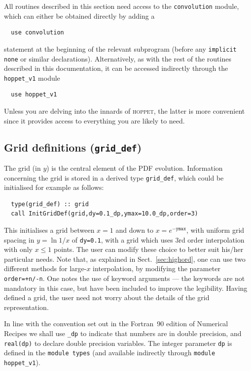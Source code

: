 \documentclass[12pt]{article}
\newcommand{\hoppet}{\textsc{hoppet}\xspace}
\newcommand{\ttt}[1]{\texttt{#1}}
\begin{document}
All routines described in this section need access to the
\texttt{convolution} module, which can either be obtained directly by
adding a 
\begin{lstlisting}
  use convolution
\end{lstlisting}
statement at the beginning of the relevant subprogram (before
any \ttt{implicit none} or similar declarations). Alternatively, as
with the rest of the routines described in this documentation, it can
be accessed indirectly through the \ttt{hoppet\_v1} module
\begin{lstlisting}
  use hoppet_v1
\end{lstlisting}
Unless you are delving into the innards of  \hoppet, the latter is
more convenient since it provides access to everything you are likely
to need.

\subsection{Grid definitions (\texttt{grid\_def})}
\label{sec:grid}

The grid (in $y$) is the central element of the PDF evolution.
Information concerning the grid is stored in a derived type
\texttt{grid\_def}, which could be initialised 
for example as follows:
\begin{lstlisting}
  type(grid_def) :: grid
  call InitGridDef(grid,dy=0.1_dp,ymax=10.0_dp,order=3)
\end{lstlisting}
This initialises a grid between $x=1$ and down to $x =
e^{-\texttt{ymax}}$, with uniform grid spacing in $y = \ln 1/x$ of
\texttt{dy=0.1}, with a grid which  uses 3rd order interpolation
with only $x\le 1$ points.
The user can modify these choice to better
suit his/her particular needs. Note that, as explained
in Sect.~\ref{sec:highord}, one can use two different
methods for large-$x$ interpolation, by modifying
the parameter {\tt order=+n/-n}.
One notes 
the use of keyword arguments --- the keywords are not
mandatory in this case, but have been included to improve the
legibility. Having defined a grid, 
the user need not worry about the details of
the grid representation.

In line with the convention set out in the Fortran~90 edition of
Numerical Recipes \cite{NRf90} we shall use \texttt{\_dp} to indicate
that numbers are in double precision, and \ttt{real(dp)} to declare
double precision variables. The integer parameter \ttt{dp} is defined
in the \texttt{module types} (and available indirectly through
\ttt{module hoppet\_v1}).
\end{document}
